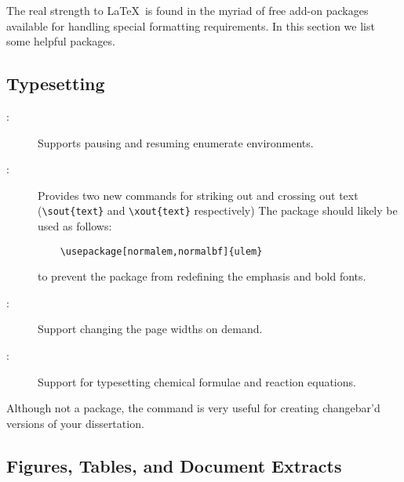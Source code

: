 The real strength to \LaTeX\ is found in the myriad of free add-on
packages available for handling special formatting requirements.
In this section we list some helpful packages.

\subsection{Typesetting}

\begin{description}
\item[:]
Supports pausing and resuming enumerate environments.

\item[:]
Provides two new commands for striking out and crossing out text
(\verb+\sout{text}+ and \verb+\xout{text}+ respectively)
The package should likely
be used as follows:
\begin{verbatim}
	\usepackage[normalem,normalbf]{ulem}
\end{verbatim}
to prevent the package from redefining the emphasis and bold fonts.

\item[:]
Support changing the page widths on demand.

\item[:] 
Support for typesetting chemical formulae and reaction equations.

\end{description}

Although not a package, the
command is very useful for creating changebar'd versions of your
dissertation.


\subsection{Figures, Tables, and Document Extracts}

